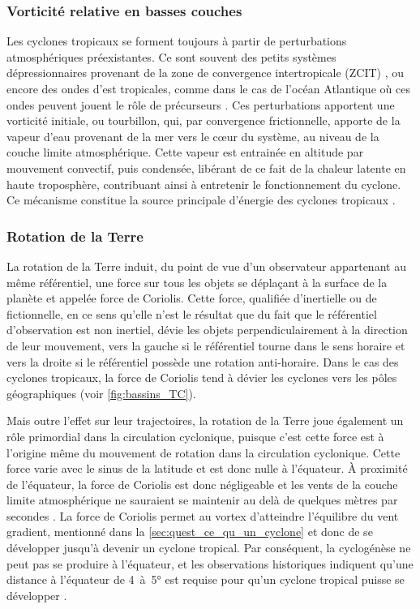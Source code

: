 \documentclass[../main.tex]{subfiles}
\begin{document}
\subsubsection{Vorticité relative en basses couches}

Les cyclones tropicaux se forment toujours à partir de perturbations atmosphériques préexistantes. Ce sont souvent des petits systèmes dépressionnaires
provenant de la zone de convergence intertropicale (ZCIT) \parencite{gray_global_1968}, ou encore des ondes d'est tropicales, comme dans le cas de l'océan
Atlantique où ces ondes peuvent jouent le rôle de précurseurs \parencite{thorncroft_african_2001,patricola_response_2018}. Ces perturbations apportent une
vorticité initiale, ou tourbillon, qui, par convergence frictionnelle, apporte de la vapeur d'eau provenant de la mer vers le cœur du système, au niveau de la
couche limite atmosphérique. Cette vapeur est entrainée en altitude par mouvement convectif, puis condensée, libérant de ce fait de la chaleur latente en haute
troposphère, contribuant ainsi à entretenir le fonctionnement du cyclone. Ce mécanisme constitue la source principale d'énergie des cyclones tropicaux
\parencite{emanuel_dependence_1987}.

\subsubsection{Rotation de la Terre}

La rotation de la Terre induit, du point de vue d'un observateur appartenant au même référentiel, une force sur tous les objets se déplaçant à la surface de la
planète et appelée force de Coriolis. Cette force, qualifiée d'inertielle ou de fictionnelle, en ce sens qu'elle n'est le résultat que du fait que le
référentiel d'observation est non inertiel, dévie les objets perpendiculairement à la direction de leur mouvement, vers la gauche si le référentiel tourne dans
le sens horaire et vers la droite si le référentiel possède une rotation anti-horaire. Dans le cas des cyclones tropicaux, la force de Coriolis tend à dévier
les cyclones vers les pôles géographiques (voir \cref{fig:bassins_TC}).

Mais outre l'effet sur leur trajectoires, la rotation de la Terre joue également un rôle primordial dans la circulation cyclonique, puisque c'est cette force
est à l'origine même du mouvement de rotation dans la circulation cyclonique. Cette force varie avec le sinus de la latitude et est donc nulle à l'équateur. À
proximité de l'équateur, la force de Coriolis est donc négligeable et les vents de la couche limite atmosphérique ne sauraient se maintenir au delà de quelques
mètres par secondes \parencite{gray_tropical_1975}. La force de Coriolis permet au vortex d'atteindre l'équilibre du vent gradient, mentionné dans la
\cref{sec:quest_ce_qu_un_cyclone} et donc de se développer jusqu'à devenir un cyclone tropical. Par conséquent, la cyclogénèse ne peut pas se produire à
l'équateur, et les observations historiques indiquent qu'une distance à l'équateur de \num{4}~à~\ang{5} est requise pour qu'un cyclone tropical puisse se
développer \parencite{gray_global_1968}.
\end{document}
